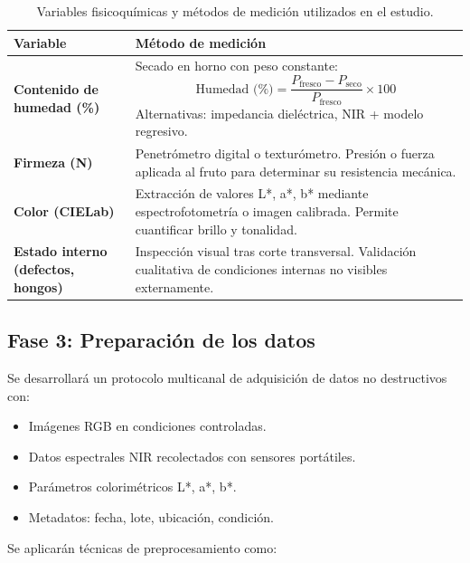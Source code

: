 \begin{table}[h]
\centering
\begin{tabular}{|p{4.5cm}|p{9cm}|}
\hline
\textbf{Variable} & \textbf{Método de medición} \\
\hline

\textbf{Contenido de humedad (\%)} &
Secado en horno con peso constante:
\begin{equation}
\text{Humedad (\%)} = \frac{P_{\text{fresco}} - P_{\text{seco}}}{P_{\text{fresco}}} \times 100
\end{equation}
Alternativas: impedancia dieléctrica, NIR + modelo regresivo. \\
\hline

\textbf{Firmeza (N)} &
Penetrómetro digital o texturómetro. Presión o fuerza aplicada al fruto para determinar su resistencia mecánica. \\
\hline

\textbf{Color (CIELab)} &
Extracción de valores L*, a*, b* mediante espectrofotometría o imagen calibrada. Permite cuantificar brillo y tonalidad. \\
\hline

\textbf{Estado interno (defectos, hongos)} &
Inspección visual tras corte transversal. Validación cualitativa de condiciones internas no visibles externamente. \\
\hline
\end{tabular}
\caption{Variables fisicoquímicas y métodos de medición utilizados en el estudio.}
\label{tab:metodos}
\end{table}

\subsection{Fase 3: Preparación de los datos}

Se desarrollará un protocolo multicanal de adquisición de datos no destructivos con:

\begin{itemize}
    \item Imágenes RGB en condiciones controladas.
    \item Datos espectrales NIR recolectados con sensores portátiles.
    \item Parámetros colorimétricos L*, a*, b*.
    \item Metadatos: fecha, lote, ubicación, condición.
\end{itemize}

Se aplicarán técnicas de preprocesamiento como:

